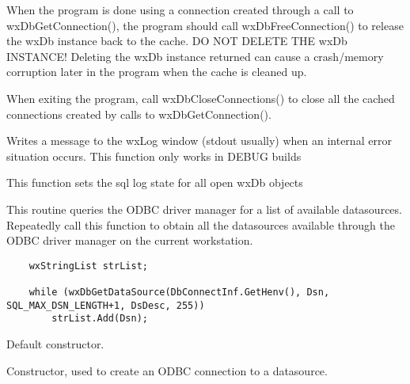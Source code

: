 When the program is done using a connection created through a call to
wxDbGetConnection(), the program should call wxDbFreeConnection() to release
the wxDb instance back to the cache.  DO NOT DELETE THE wxDb INSTANCE!
Deleting the wxDb instance returned can cause a crash/memory corruption
later in the program when the cache is cleaned up.

When exiting the program, call wxDbCloseConnections() to close all the
cached connections created by calls to wxDbGetConnection().



Writes a message to the wxLog window (stdout usually) when an internal
error situation occurs.  This function only works in DEBUG builds



This function sets the sql log state for all open wxDb objects



This routine queries the ODBC driver manager for a list of available
datasources.  Repeatedly call this function to obtain all the datasources
available through the ODBC driver manager on the current workstation.

\begin{verbatim}
    wxStringList strList;

    while (wxDbGetDataSource(DbConnectInf.GetHenv(), Dsn, SQL_MAX_DSN_LENGTH+1, DsDesc, 255))
        strList.Add(Dsn);
\end{verbatim}


\label{wxdbconstr}


Default constructor.


Constructor, used to create an ODBC connection to a datasource.

